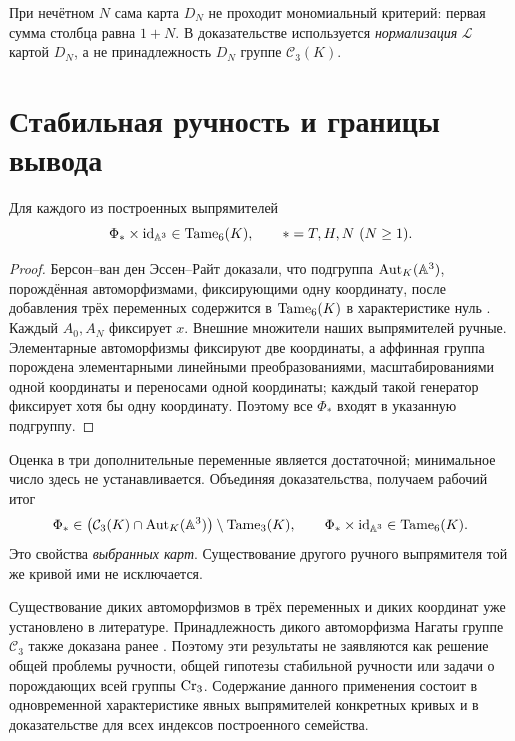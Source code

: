 \begin{remark}
При нечётном $N$ сама карта $D_N$ не проходит мономиальный критерий:
первая сумма столбца равна $1+N$. В доказательстве используется
\emph{нормализация} $\mathcal L$ картой $D_N$, а не принадлежность
$D_N$ группе $\mathcal C_3(K)$.
\end{remark}

\section{Стабильная ручность и границы вывода}\label{sec:stable-tameness}

\begin{proposition}\label{prop:stable-tameness}
Для каждого из построенных выпрямителей
\[
 \Phi_\ast\times\mathrm{id}_{{\mathbb A}^3}\in\operatorname{Tame}_6(K),
 \qquad \ast=T,H,N\ (N\ge1).
\]
\end{proposition}
\begin{proof}
Берсон--ван ден Эссен--Райт доказали, что подгруппа
$\operatorname{Aut}_K({\mathbb A}^3)$, порождённая автоморфизмами, фиксирующими одну
координату, после добавления трёх переменных содержится в
$\operatorname{Tame}_6(K)$ в характеристике нуль
\cite[следствие~4.9]{BEW2012}.
Каждый $A_0,A_N$ фиксирует $x$.
Внешние множители наших выпрямителей ручные. Элементарные
автоморфизмы фиксируют две координаты, а аффинная группа порождена
элементарными линейными преобразованиями, масштабированиями одной
координаты и переносами одной координаты; каждый такой генератор фиксирует хотя бы одну
координату. Поэтому все $\Phi_\ast$ входят в указанную подгруппу.
\end{proof}

Оценка в три дополнительные переменные является достаточной;
минимальное число здесь не устанавливается. Объединяя доказательства,
получаем рабочий итог
\[
 \Phi_\ast\in
 \bigl(\mathcal C_3(K)\cap\operatorname{Aut}_K({\mathbb A}^3)\bigr)
 \setminus\operatorname{Tame}_3(K),\qquad
 \Phi_\ast\times\mathrm{id}_{{\mathbb A}^3}\in\operatorname{Tame}_6(K).
\]
Это свойства \emph{выбранных карт}. Существование другого ручного
выпрямителя той же кривой ими не исключается.

Существование диких автоморфизмов в трёх переменных и диких координат
уже установлено в литературе. Принадлежность дикого автоморфизма Нагаты
группе $\mathcal C_3$ также доказана ранее
\cite[предложение~6.8]{BH2015}. Поэтому эти результаты не заявляются
как решение общей проблемы ручности, общей гипотезы стабильной ручности
или задачи о порождающих всей группы $\operatorname{Cr}_3$.
Содержание данного применения состоит в одновременной характеристике
явных выпрямителей конкретных кривых и в доказательстве для всех
индексов построенного семейства.
